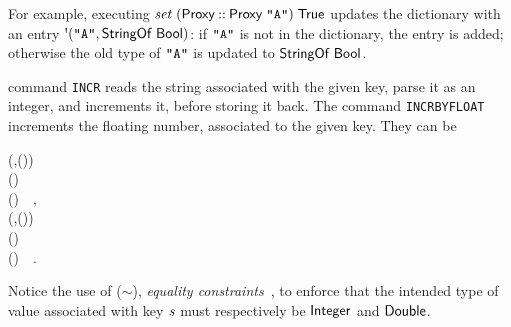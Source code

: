 For example, executing \ensuremath{\Varid{set}\;(\Conid{Proxy}\mathbin{::}\Conid{Proxy}\;\text{\tt \char34 A\char34})\;\Conid{True}} updates the dictionary
with an entry \ensuremath{\mbox{\textquotesingle}(\text{\tt \char34 A\char34},\Conid{StringOf}\;\Conid{Bool})}: if \ensuremath{\text{\tt \char34 A\char34}} is not in the dictionary,
the entry is added; otherwise the old type of \ensuremath{\text{\tt \char34 A\char34}} is updated to
\ensuremath{\Conid{StringOf}\;\Conid{Bool}}.

\Redis{} command \texttt{INCR} reads the string associated with the given key,
parse it as an integer, and increments it, before storing it back. The command
\texttt{INCRBYFLOAT} increments the floating number, associated to the given
key. They can be
\begin{hscode}\SaveRestoreHook
{}%
%
%
%
\>[B]{}\<[7]%
\>[7]{}\mathbin{::}(\;,\;\;\mathord{\sim}\;(\;)){}\<[E]%
\\
\>[7]{}\Rightarrow {}\;\to {}\;\;\;(\;\;){}\<[E]%
\\
\>[B]{}\;\mathrel{=}\mathbin{\$}\;(\;)~~,{}\<[E]%
\\[\blanklineskip]%
\>[B]{}\<[14]%
\>[14]{}\mathbin{::}(\;,\;\;\mathord{\sim}\;(\;)){}\<[E]%
\\
\>[14]{}\Rightarrow {}\;\to {}\to {}\;\;\;(\;\;){}\<[E]%
\\
\>[B]{}\;\;\mathrel{=}\mathbin{\$}\;(\;)\;~~.{}\<[E]%
\ColumnHook
\end{hscode}\resethooks
Notice the use of (\ensuremath{\mathord{\sim}}), \emph{equality constraints}~\cite{typeeq}, to enforce
that the intended type of value associated with key \ensuremath{\Varid{s}} must respectively be
\ensuremath{\Conid{Integer}} and \ensuremath{\Conid{Double}}.

